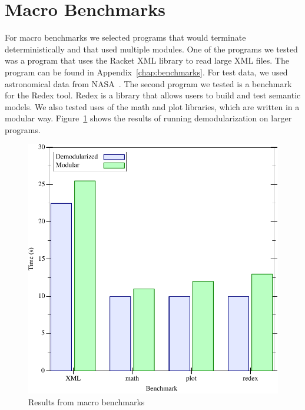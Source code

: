 \section{Macro Benchmarks}
For macro benchmarks we selected programs that would terminate deterministically and that used multiple modules.
One of the programs we tested was a program that uses the Racket XML library to read large XML files.
The program can be found in Appendix~\ref{chap:benchmarks}.
For test data, we used astronomical data from NASA~\cite{nasa}. 
The second program we tested is a benchmark for the Redex tool.
Redex is a library that allows users to build and test semantic models.
We also tested uses of the math and plot libraries, which are written in a modular way. 
Figure~\ref{fig:macro-results} shows the results of running demodularization on larger programs.
\begin{figure}
\includegraphics[width=.8\textwidth]{figures/macro-results}
\caption{Results from macro benchmarks}
\label{fig:macro-results}
\end{figure}

